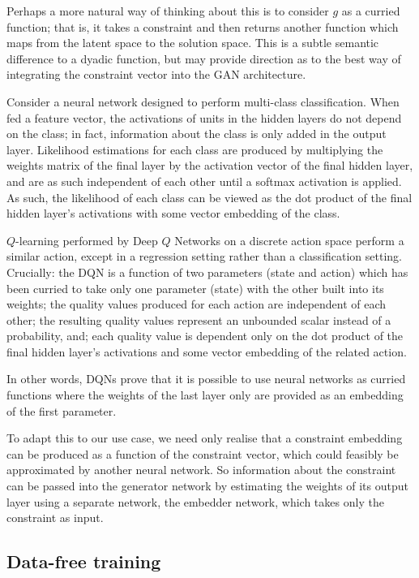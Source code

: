 \documentclass[../../main.tex]{subfiles}
\begin{document}
Perhaps a more natural way of thinking about this is to consider $g$ as a curried function; that is, it takes a constraint and then returns another function which maps from the latent space to the solution space.
This is a subtle semantic difference to a dyadic function, but may provide direction as to the best way of integrating the constraint vector into the GAN architecture.

Consider a neural network designed to perform multi-class classification.
When fed a feature vector, the activations of units in the hidden layers do not depend on the class; in fact, information about the class is only added in the output layer.
Likelihood estimations for each class are produced by multiplying the weights matrix of the final layer by the activation vector of the final hidden layer, and are as such independent of each other until a softmax activation is applied.
As such, the likelihood of each class can be viewed as the dot product of the final hidden layer's activations with some vector embedding of the class.

$Q$-learning performed by Deep $Q$ Networks on a discrete action space perform a similar action, except in a regression setting rather than a classification setting.
Crucially: the DQN is a function of two parameters (state and action) which has been curried to take only one parameter (state) with the other built into its weights; the quality values produced for each action are independent of each other; the resulting quality values represent an unbounded scalar instead of a probability, and; each quality value is dependent only on the dot product of the final hidden layer's activations and some vector embedding of the related action.

In other words, DQNs prove that it is possible to use neural networks as curried functions where the weights of the last layer only are provided as an embedding of the first parameter.

To adapt this to our use case, we need only realise that a constraint embedding can be produced as a function of the constraint vector, which could feasibly be approximated by another neural network.
So information about the constraint can be passed into the generator network by estimating the weights of its output layer using a separate network, the embedder network, which takes only the constraint as input.

\subsection{Data-free training} \label{subsection:dataFreeTraining}
\end{document}
